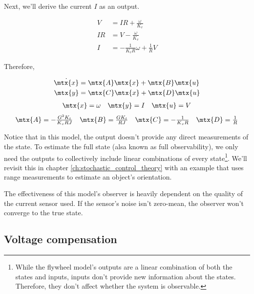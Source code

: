 Next, we'll derive the current $I$ as an output.

\begin{align*}
  V &= IR + \frac{\omega}{K_v} \\
  IR &= V - \frac{\omega}{K_v} \\
  I &= -\frac{1}{K_v R} \omega + \frac{1}{R} V
\end{align*}

Therefore,

\begin{theorem}
  \begin{align*}
    \dot{\mtx{x}} &= \mtx{A} \mtx{x} + \mtx{B} \mtx{u} \\
    \mtx{y} &= \mtx{C} \mtx{x} + \mtx{D} \mtx{u}
  \end{align*}
  \begin{equation*}
    \begin{array}{ccc}
      \mtx{x} = \omega &
      \mtx{y} = I &
      \mtx{u} = V
    \end{array}
  \end{equation*}
  \begin{equation}
    \begin{array}{cccc}
      \mtx{A} = -\frac{G^2 K_t}{K_v RJ} &
      \mtx{B} = \frac{G K_t}{RJ} &
      \mtx{C} = -\frac{1}{K_v R} &
      \mtx{D} = \frac{1}{R}
    \end{array}
  \end{equation}
\end{theorem}

Notice that in this \gls{model}, the \gls{output} doesn't provide any direct
measurements of the \gls{state}. To estimate the full \gls{state} (alsa known as
full observability), we only need the \glspl{output} to collectively include
linear combinations of every \gls{state}\footnote{While the flywheel model's
outputs are a linear combination of both the states and inputs, \glspl{input}
don't provide new information about the \glspl{state}. Therefore, they don't
affect whether the system is observable.}. We'll revisit this in chapter
\ref{ch:stochastic_control_theory} with an example that uses range measurements
to estimate an object's orientation.

The effectiveness of this \gls{model}'s \gls{observer} is heavily dependent on
the quality of the current sensor used. If the sensor's noise isn't zero-mean,
the \gls{observer} won't converge to the true \gls{state}.

\subsection{Voltage compensation}

